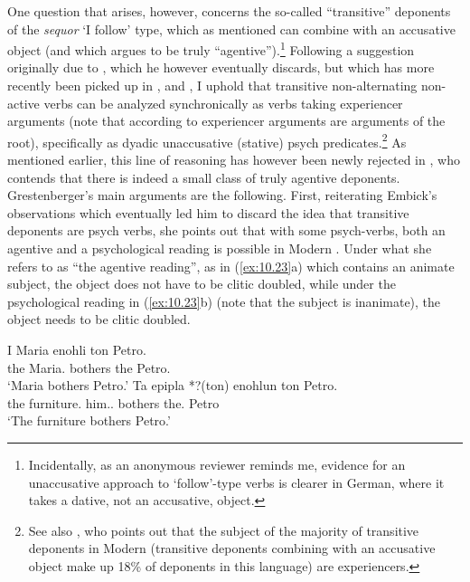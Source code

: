 \documentclass[output=paper]{langsci/langscibook}
\begin{document}
One question that arises, however, concerns the so-called “transitive”
\citep{Embick1997} deponents of the \emph{sequor} ‘I follow’ type, which as
mentioned can combine with an accusative object (and which
\citeauthor{Grestenberger2014} argues to be truly
“agentive”).\footnote{Incidentally, as an anonymous reviewer reminds me,
evidence for an unaccusative approach to ‘follow’-type verbs is clearer in
German, where it takes a dative, not an accusative, object.} Following a
suggestion originally due to \citet{Embick1997}, which he however eventually
discards, but which has more recently been picked up in \citet{Alexiadou2013},
\citet{Kallulli2013} and \citet{ZomAle2014}, I uphold that transitive
non-alternating non-active verbs can be analyzed synchronically as verbs taking
experiencer arguments (note that according to \citet{Pesetsky1995} experiencer
arguments are arguments of the root), specifically as dyadic unaccusative
(stative) psych predicates.\footnote{See also \citet{Zombolou2012}, who points
    out that the subject of the majority of transitive deponents in Modern
     (transitive deponents combining with an accusative object make up
18\% of deponents in this language) are experiencers.} As mentioned earlier,
this line of reasoning has however been newly rejected in
\textcite{Grestenberger2014,Grestenberger2018a}, who contends that there is
indeed a small class of truly agentive deponents. Grestenberger’s main
arguments are the following. First, reiterating Embick’s observations which
eventually led him to discard the idea that transitive deponents are psych
verbs, she points out that with some psych-verbs, both an agentive and a
psychological reading is possible in Modern . Under what she refers to as
“the agentive reading”, as in (\ref{ex:10.23}a) which contains an
animate
subject, the object does not have to be clitic doubled, while under the
psychological reading in (\ref{ex:10.23}b) (note that the subject is
inanimate), the object needs to be clitic doubled.

\ea\label{ex:10.23} 
    \ea
	\gll    I    Maria    enohli  ton  Petro.\\
            the  Maria.\Nom{}  bothers  the Petro.\Acc{}\\
    \glt    ‘Maria bothers Petro.’
    \ex
	\gll    Ta    epipla    *?(ton)    enohlun  ton  Petro.\\
            the  furniture.\Nom{} \hphantom{*?(}him.\Cl.\Acc{}  bothers the.\Acc{}  Petro\\
    \glt    ‘The furniture bothers Petro.’
    \z
\z
\end{document}
